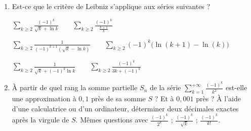 \begin{frame}
\begin{miniexercice}
\begin{enumerate}
  \item Est-ce que le critère de Leibniz s'applique aux séries suivantes ?
  
  \centerline{$\displaystyle
  \sum_{k\ge 2} \frac{(-1)^k}{\sqrt k + \ln k} \qquad
  \sum_{k\ge 2} \frac{(-1)^k}{\frac{k+1}{k}} 
  $}
  
  \centerline{$\displaystyle
  \sum_{k\ge2} \frac{1}{(-1)^{k+1}(\sqrt k - \ln k)}  \qquad
  \sum_{k\ge 2} (-1)^k\big(\ln(k+1)-\ln(k)\big)$ }
  
  \centerline{$\displaystyle
  \sum_{k\ge2} \frac{1}{\sqrt k + (-1)^{k}\ln k} \qquad
  \sum_{k\ge 2} \frac{(-1)^k}{3k + (-1)^k}$}
  

  \item \`A partir de quel rang la somme partielle
  $S_n$ de la série $\displaystyle\sum_{k=1}^{+\infty} \frac{(-1)^k}{k^2}$ 
  est-elle une approximation à $0,1$ près de sa somme $S$ ?
  Et à $0,001$ près ?
  \`A l'aide d'une calculatrice ou d'un ordinateur, déterminer deux décimales
  exactes après la virgule de $S$.
  Mêmes questions avec  $\frac{(-1)^k}{2^k}$ ; $\frac{(-1)^k}{\sqrt{k}}$ ;
  $\frac{(-1)^k}{k!}$.
  
\end{enumerate}
\end{miniexercice}
\end{frame}

